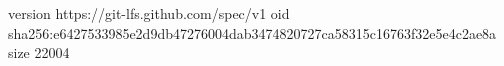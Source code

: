 version https://git-lfs.github.com/spec/v1
oid sha256:e6427533985e2d9db47276004dab3474820727ca58315c16763f32e5e4c2ae8a
size 22004
